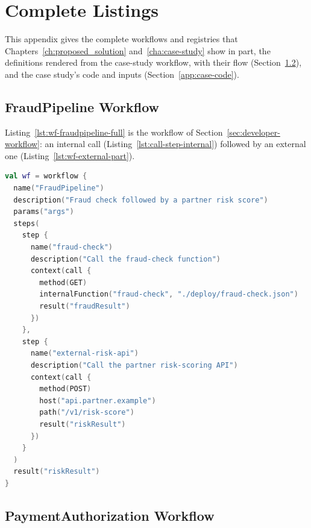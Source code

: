 \chapter{Complete Listings}
\label{app:listings}

This appendix gives the complete workflows and registries that Chapters~\ref{ch:proposed_solution}
and~\ref{cha:case-study} show in part, the definitions rendered from the case-study workflow, with
their flow (Section~\ref{app:case-workflow}), and the case study's code and inputs
(Section~\ref{app:case-code}).

\section{FraudPipeline Workflow}

Listing~\ref{lst:wf-fraudpipeline-full} is the workflow of Section~\ref{sec:developer-workflow}: an
internal call (Listing~\ref{lst:call-step-internal}) followed by an external one
(Listing~\ref{lst:wf-external-part}).

\begin{lstlisting}[language=Kotlin,caption={FraudPipeline workflow: one call resolved through the registry and one with a literal endpoint.},label={lst:wf-fraudpipeline-full},basicstyle=\ttfamily\small,breaklines=false]
val wf = workflow {
  name("FraudPipeline")
  description("Fraud check followed by a partner risk score")
  params("args")
  steps(
    step {
      name("fraud-check")
      description("Call the fraud-check function")
      context(call {
        method(GET)
        internalFunction("fraud-check", "./deploy/fraud-check.json")
        result("fraudResult")
      })
    },
    step {
      name("external-risk-api")
      description("Call the partner risk-scoring API")
      context(call {
        method(POST)
        host("api.partner.example")
        path("/v1/risk-score")
        result("riskResult")
      })
    }
  )
  result("riskResult")
}
\end{lstlisting}

\section{PaymentAuthorization Workflow}
\label{app:case-workflow}

